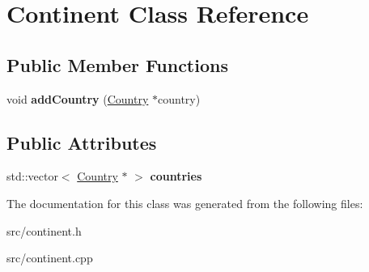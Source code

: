 \hypertarget{class_continent}{}\section{Continent Class Reference}
\label{class_continent}
\subsection*{Public Member Functions}
\begin{DoxyCompactItemize}
\item 
\hypertarget{class_continent_a734a82cb03fbd7edebd9088b72b75f9d}{}void {\bfseries add\+Country} (\hyperlink{class_country}{Country} $\ast$country)\label{class_continent_a734a82cb03fbd7edebd9088b72b75f9d}

\end{DoxyCompactItemize}
\subsection*{Public Attributes}
\begin{DoxyCompactItemize}
\item 
\hypertarget{class_continent_a095993408efbfeb34c4e9b6b649e7f20}{}std\+::vector$<$ \hyperlink{class_country}{Country} $\ast$ $>$ {\bfseries countries}\label{class_continent_a095993408efbfeb34c4e9b6b649e7f20}

\end{DoxyCompactItemize}


The documentation for this class was generated from the following files\+:\begin{DoxyCompactItemize}
\item 
src/continent.\+h\item 
src/continent.\+cpp\end{DoxyCompactItemize}
